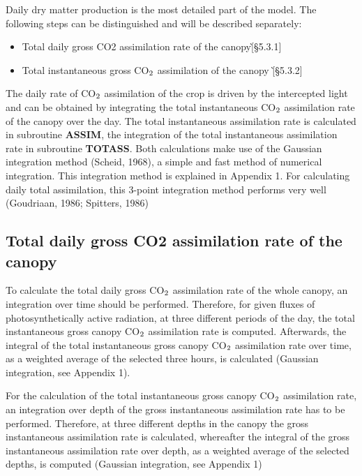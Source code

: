 Daily dry matter production is the most detailed part of the model. The following steps
can be distinguished and will be described separately:
\begin{itemize}
\item Total daily gross CO2 assimilation rate of the canopy\`[\S 5.3.1]
\item Total instantaneous gross CO$_{{\rm 2}}$ assimilation of the canopy \`[\S 5.3.2]
\end{itemize}
 
The daily rate of CO$_{{\rm 2}}$ assimilation of the crop is driven by the intercepted light and can
be obtained by integrating the total instanta\-neous CO$_{{\rm 2}}$ assimilation rate of the canopy over
the day. The total instantaneous assimilation rate is calculated in subrou\-tine {\bf ASSIM}, the
integra\-tion of the total instantaneous assimilation rate in subrou\-tine {\bf TOTASS}. Both
calcula\-tions make use of the Gaussian integration method (Scheid, 1968), a simple and
fast method of numerical integration. This integration method is explained in Appendix 1.
For calculat\-ing daily total assimilation, this 3-point integration method performs very well
(Goudria\-an, 1986; Spitters, 1986)

\subsection{Total daily gross CO2 assimilation rate of the canopy}

To calculate the total daily gross CO$_{{\rm 2}}$ assimilation rate of the whole canopy, an integra\-tion over time should be performed. Therefore, for given fluxes of photosyntheti\-cally
active radiation, at three different periods of the day, the total instantaneous gross canopy
CO$_{{\rm 2}}$ assimila\-tion rate is computed. Afterwards, the integral of the total instantaneous
gross canopy CO$_{{\rm 2}}$ assimila\-tion rate over time, as a weighted average of the selected three
hours, is calculat\-ed (Gaussian integration, see Appendix 1).

For the calculation of the total instantaneous gross canopy CO$_{{\rm 2}}$ assimilation rate, an
integra\-tion over depth of the gross instantaneous assimilation rate has to be per\-formed.
Therefore, at three different depths in the canopy the gross instanta\-neous assimilation rate
is calculated, whereafter the integral of the gross instantaneous assimila\-tion rate over
depth, as a weighted average of the selected depths, is computed (Gaussian integration,
see Appendix 1)

